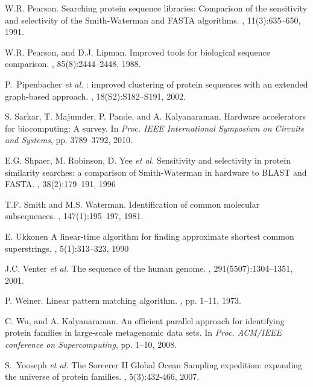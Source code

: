 \documentclass[10pt,journal,letterpaper,compsoc]{IEEEtran}
\begin{document}
\begin{thebibliography}{1}
W.R. Pearson.
\newblock Searching protein sequence libraries: Comparison of the sensitivity and selectivity of the Smith-Waterman and FASTA algorithms.
, 11(3):635--650, 1991.

W.R. Pearson, and D.J. Lipman.
\newblock Improved tools for biological sequence comparison.
, 85(8):2444--2448, 1988.



P.~Pipenbacher {\it et al.}
: improved clustering of protein sequences with an extended graph-based approach.
, 18(S2):S182--S191, 2002.

S. Sarkar, T. Majumder, P. Pande, and A. Kalyanaraman.
\newblock Hardware accelerators for biocomputing: A survey. 
\newblock In {\em Proc. IEEE International Symposium on Circuits and Systems}, pp. 3789--3792, 2010. 

E.G. Shpaer, M. Robinson, D. Yee {\it et al.}
\newblock Sensitivity and selectivity in protein similarity searches: a comparison of Smith-Waterman in hardware to BLAST and FASTA.
, 38(2):179--191, 1996

T.F. Smith and M.S. Waterman.
\newblock Identification of common molecular subsequences.
, 147(1):195--197, 1981.

E. Ukkonen
\newblock A linear-time algorithm for finding approximate shortest common superstrings.
, 5(1):313--323, 1990

J.C. Venter {\it et al.}
\newblock The sequence of the human genome.
, 291(5507):1304--1351, 2001.

P. Weiner.
\newblock Linear pattern matching algorithm.
, pp. 1--11, 1973.

C. Wu, and A. Kalyanaraman.
\newblock An efficient parallel approach for identifying protein families in large-scale metagenomic data sets.
\newblock In {\em Proc. ACM/IEEE conference on Supercomputing}, pp. 1--10, 2008.


S.~Yooseph {\it et al.}
\newblock The Sorcerer II Global Ocean Sampling expedition: expanding the universe of protein families.
, 5(3):432-466, 2007.


\end{thebibliography}




\end{document}
